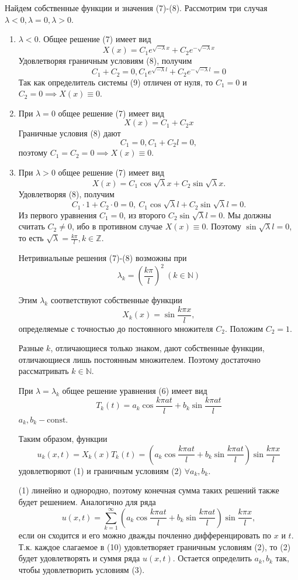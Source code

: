 Найдем собственные функции и значения (7)-(8). Рассмотрим три случая $\lambda<0, \lambda=0, \lambda>0$.
\begin{enumerate}
	\item{
			$\lambda<0$. Общее решение (7) имеет вид
			\[
				X(x) = C_1 e^{\sqrt{-\lambda}x} + C_2 e^{-\sqrt{-\lambda}x}
			\]
			Удовлетворяя граничным условиям (8), получим
			\[
				C_1 + C_2 = 0, C_1 e^{\sqrt{-\lambda} l}+C_2 e^{-\sqrt{-\lambda}l}=0 \tag{9}
			\]
			Так как определитель системы (9) отличен от нуля, то $C_1=0$ и $C_2=0 \implies X(x)\equiv 0$. 
	}
	\item{
			При $\lambda=0$ общее решение (7) имеет вид
			\[
				X(x) = C_1 + C_2 x
			\]
			Граничные условия (8) дают
			\[
				C_1 = 0, C_1 + C_2 l = 0,
			\]
			поэтому $C_1=C_2=0 \implies X(x)\equiv0.$
	}
	\item{
			При $\lambda > 0$ общее решение (7) имеет вид
			\[
				X(x) = C_1 \cos \sqrt{\lambda} x + C_2 \sin \sqrt{\lambda} x.
			\]
			Удовлетворяя (8), получим
			\[
				C_1 \cdot 1 + C_2 \cdot 0 = 0, ~ C_1 \cos \sqrt{\lambda} l + C_2 \sin \sqrt{\lambda} l = 0.
			\]
			Из первого уравнения $C_1 = 0$, из второго $C_2 \sin \sqrt{\lambda} l = 0$. Мы должны считать $C_2 \ne 0$, ибо в противном случае $X(x) \equiv 0$. Поэтому $\sin \sqrt{\lambda} l = 0$, то есть $\sqrt{\lambda} = \frac{k \pi}{l}, k \in \mathbb{Z}$.

			Нетривиальные решения (7)-(8) возможны при
			\[
				\lambda_k = \left( \frac{k \pi}{l} \right)^2 ~ (k \in \mathbb{N})
			\]

			Этим $\lambda_k$ соответствуют собственные функции
			\[
				X_k (x) = \sin \frac{k \pi x}{l},
			\]
			определяемые с точностью до постоянного множителя $C_2$. Положим $C_2=1$.

			Разные $k$, отличающиеся только знаком, дают собственные функции, отличающиеся лишь постоянным множителем. Поэтому достаточно рассматривать $k \in \mathbb{N}$.

			При $\lambda = \lambda_k$ общее решение уравнения (6) имеет вид
			\[
				T_k (t) = a_k \cos \frac{k \pi at}{l} + b_k \sin \frac{k \pi at}{l}
			\]
			$a_k, b_k - \mathrm{const}$.

			Таким образом, функции
			\[
				u_k (x, t) = X_k (x) T_k (t) = \left( a_k \cos \frac{k \pi at}{l} + b_k \sin \frac{k \pi at}{l} \right) \sin \frac{k \pi x}{l}
			\]
			удовлетворяют (1) и граничным условиям (2) $\forall a_k, b_k$.

			(1) линейно и однородно, поэтому конечная сумма таких решений также будет решением. Аналогично для ряда
			\[
				u(x, t) = \sum_{k=1}^\infty \left( a_k \cos \frac{k \pi at}{l} + b_k \sin \frac{k \pi at}{l} \right) \sin \frac{k \pi x}{l}, \tag{10}
			\]
			если он сходится и его можно дважды почленно дифференцировать по $x$ и $t$. Т.к. каждое слагаемое в (10) удовлетворяет граничным условиям (2), то (2) будет удовлетворять и суммя ряда $u(x, t)$. Остается определить $a_k, b_k$ так, чтобы удовлетворить условиям (3).

}
\end{enumerate}
